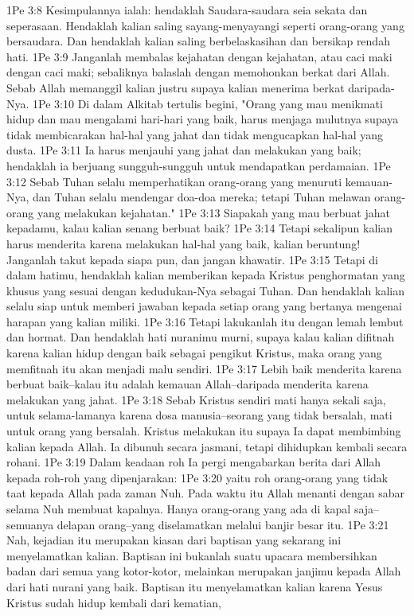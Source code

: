1Pe 3:8  Kesimpulannya ialah: hendaklah Saudara-saudara seia sekata dan seperasaan. Hendaklah kalian saling sayang-menyayangi seperti orang-orang yang bersaudara. Dan hendaklah kalian saling berbelaskasihan dan bersikap rendah hati.
1Pe 3:9  Janganlah membalas kejahatan dengan kejahatan, atau caci maki dengan caci maki; sebaliknya balaslah dengan memohonkan berkat dari Allah. Sebab Allah memanggil kalian justru supaya kalian menerima berkat daripada-Nya.
1Pe 3:10  Di dalam Alkitab tertulis begini, "Orang yang mau menikmati hidup dan mau mengalami hari-hari yang baik, harus menjaga mulutnya supaya tidak membicarakan hal-hal yang jahat dan tidak mengucapkan hal-hal yang dusta.
1Pe 3:11  Ia harus menjauhi yang jahat dan melakukan yang baik; hendaklah ia berjuang sungguh-sungguh untuk mendapatkan perdamaian.
1Pe 3:12  Sebab Tuhan selalu memperhatikan orang-orang yang menuruti kemauan-Nya, dan Tuhan selalu mendengar doa-doa mereka; tetapi Tuhan melawan orang-orang yang melakukan kejahatan."
1Pe 3:13  Siapakah yang mau berbuat jahat kepadamu, kalau kalian senang berbuat baik?
1Pe 3:14  Tetapi sekalipun kalian harus menderita karena melakukan hal-hal yang baik, kalian beruntung! Janganlah takut kepada siapa pun, dan jangan khawatir.
1Pe 3:15  Tetapi di dalam hatimu, hendaklah kalian memberikan kepada Kristus penghormatan yang khusus yang sesuai dengan kedudukan-Nya sebagai Tuhan. Dan hendaklah kalian selalu siap untuk memberi jawaban kepada setiap orang yang bertanya mengenai harapan yang kalian miliki.
1Pe 3:16  Tetapi lakukanlah itu dengan lemah lembut dan hormat. Dan hendaklah hati nuranimu murni, supaya kalau kalian difitnah karena kalian hidup dengan baik sebagai pengikut Kristus, maka orang yang memfitnah itu akan menjadi malu sendiri.
1Pe 3:17  Lebih baik menderita karena berbuat baik--kalau itu adalah kemauan Allah--daripada menderita karena melakukan yang jahat.
1Pe 3:18  Sebab Kristus sendiri mati hanya sekali saja, untuk selama-lamanya karena dosa manusia--seorang yang tidak bersalah, mati untuk orang yang bersalah. Kristus melakukan itu supaya Ia dapat membimbing kalian kepada Allah. Ia dibunuh secara jasmani, tetapi dihidupkan kembali secara rohani.
1Pe 3:19  Dalam keadaan roh Ia pergi mengabarkan berita dari Allah kepada roh-roh yang dipenjarakan:
1Pe 3:20  yaitu roh orang-orang yang tidak taat kepada Allah pada zaman Nuh. Pada waktu itu Allah menanti dengan sabar selama Nuh membuat kapalnya. Hanya orang-orang yang ada di kapal saja--semuanya delapan orang--yang diselamatkan melalui banjir besar itu.
1Pe 3:21  Nah, kejadian itu merupakan kiasan dari baptisan yang sekarang ini menyelamatkan kalian. Baptisan ini bukanlah suatu upacara membersihkan badan dari semua yang kotor-kotor, melainkan merupakan janjimu kepada Allah dari hati nurani yang baik. Baptisan itu menyelamatkan kalian karena Yesus Kristus sudah hidup kembali dari kematian,
